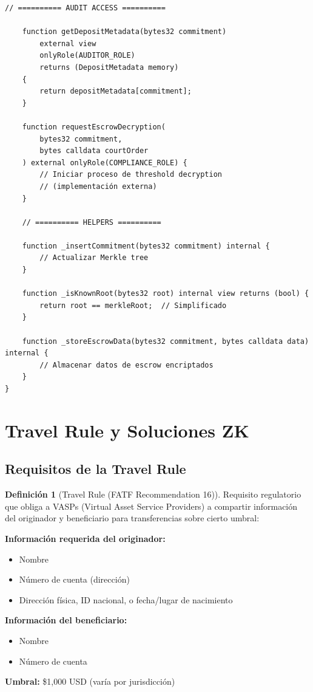 \documentclass[11pt,a4paper,twoside]{book}
\theoremstyle{definition}
\newtheorem{definition}{Definición}[chapter]
\theoremstyle{remark}
\begin{document}
\begin{lstlisting}[language=Solidity, caption={Regulatory-Compliant Mixer Contract}]
    // ========== AUDIT ACCESS ==========
    
    function getDepositMetadata(bytes32 commitment) 
        external view 
        onlyRole(AUDITOR_ROLE)
        returns (DepositMetadata memory) 
    {
        return depositMetadata[commitment];
    }
    
    function requestEscrowDecryption(
        bytes32 commitment,
        bytes calldata courtOrder
    ) external onlyRole(COMPLIANCE_ROLE) {
        // Iniciar proceso de threshold decryption
        // (implementación externa)
    }
    
    // ========== HELPERS ==========
    
    function _insertCommitment(bytes32 commitment) internal {
        // Actualizar Merkle tree
    }
    
    function _isKnownRoot(bytes32 root) internal view returns (bool) {
        return root == merkleRoot;  // Simplificado
    }
    
    function _storeEscrowData(bytes32 commitment, bytes calldata data) internal {
        // Almacenar datos de escrow encriptados
    }
}
\end{lstlisting}

\section{Travel Rule y Soluciones ZK}
\label{sec:travel-rule}

\subsection{Requisitos de la Travel Rule}

\begin{definition}[Travel Rule (FATF Recommendation 16)]
Requisito regulatorio que obliga a VASPs (Virtual Asset Service Providers) a compartir información del originador y beneficiario para transferencias sobre cierto umbral:

\textbf{Información requerida del originador:}
\begin{itemize}
    \item Nombre
    \item Número de cuenta (dirección)
    \item Dirección física, ID nacional, o fecha/lugar de nacimiento
\end{itemize}

\textbf{Información del beneficiario:}
\begin{itemize}
    \item Nombre
    \item Número de cuenta
\end{itemize}

\textbf{Umbral:} \$1,000 USD (varía por jurisdicción)
\end{definition}
\end{document}
